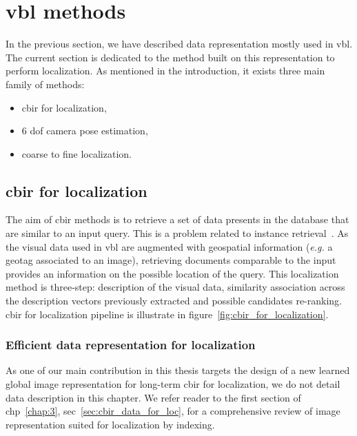 \section{\acs*{vbl} methods}

In the previous section, we have described data representation mostly used in \ac{vbl}. The current section is dedicated to the method built on this representation to perform localization. As mentioned in the introduction, it exists three main family of methods:
\begin{itemize}
	\item \Acf{cbir} for localization,
	\item 6 \ac{dof} camera pose estimation,
	\item coarse to fine localization.
\end{itemize}

\label{sec:vbl_methods}
	
\subsection{\acs*{cbir} for localization}


\label{subsec:vbl_as_image_retrieval}
The aim of \ac{cbir} methods is to retrieve a set of data presents in the database that are similar to an input query. This is a problem related to instance retrieval~\citep{Zheng2017}. As the visual data used in \ac{vbl} are augmented with geospatial information (\textit{e.g.} a geotag associated to an image), retrieving documents comparable to the input provides an information on the possible location of the query. This localization method is three-step: description of the visual data, similarity association across the description vectors previously extracted and possible candidates re-ranking. \acs*{cbir} for localization pipeline is illustrate in figure~\ref{fig:cbir_for_localization}.

\subsubsection{Efficient data representation for localization}
As one of our main contribution in this thesis targets the design of a new learned global image representation for long-term \ac{cbir} for localization, we do not detail data description in this chapter. We refer reader to the first section of \acl{chp}~\ref{chap:3}, \acs{sec}~\ref{sec:cbir_data_for_loc}, for a comprehensive review of image representation suited for localization by indexing.


